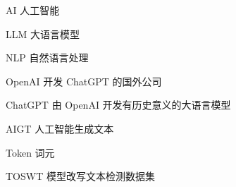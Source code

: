 %
%
%
%

\begin{symbols}
  \item[AI] 人工智能
  \item[LLM] 大语言模型
  \item[NLP] 自然语言处理
  \item[OpenAI] 开发 ChatGPT 的国外公司
  \item[ChatGPT] 由 OpenAI 开发有历史意义的大语言模型
  \item[AIGT] 人工智能生成文本
  \item[Token] 词元
  \item[TOSWT] 模型改写文本检测数据集
\end{symbols}

